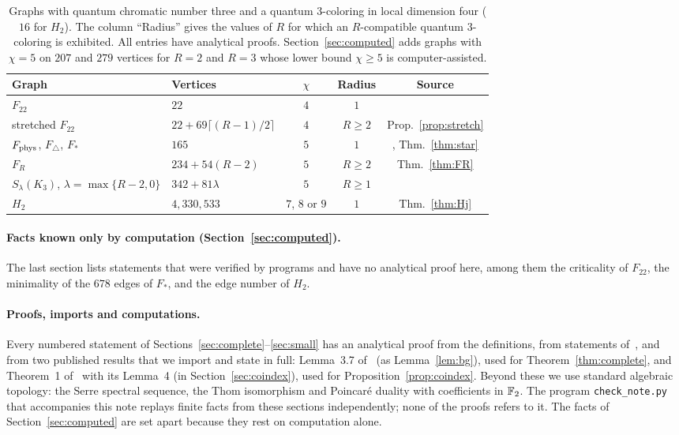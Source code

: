 \begin{table}[t]
\centering
\small\setlength{\tabcolsep}{5pt}
\begin{tabular}{@{}llccc@{}}
\toprule
Graph & Vertices & $\chi$ & Radius & Source\\
\midrule
$F_{22}$ & $22$ & $4$ & $1$ & \cite[Prop.~6.1]{Z}\\
stretched $F_{22}$ & $22+69\lceil(R-1)/2\rceil$ & $4$ & $R\ge2$ & Prop.~\ref{prop:stretch}\\
$F_{\rm phys}$, $F_\triangle$, $F_*$ & $165$ & $5$ & $1$ & \cite[Thm.~6.2]{Z}, Thm.~\ref{thm:star}\\
$F_R$ & $234+54(R-2)$ & $5$ & $R\ge2$ & Thm.~\ref{thm:FR}\\
$S_\lambda(K_3)$, $\lambda=\max\{R-2,0\}$ & $342+81\lambda$ & $5$ & $R\ge1$ & \cite[Thm.~2.4]{Z}\\
$H_2$ & $4{,}330{,}533$ & $7$, $8$ or $9$ & $1$ & Thm.~\ref{thm:Hj}\\
\bottomrule
\end{tabular}
\caption{Graphs with quantum chromatic number three and a quantum $3$-coloring in local dimension four ($16$ for $H_2$). The column ``Radius'' gives the values of $R$ for which an $R$-compatible quantum $3$-coloring is exhibited. All entries have analytical proofs. Section~\ref{sec:computed} adds graphs with $\chi=5$ on $207$ and $279$ vertices for $R=2$ and $R=3$ whose lower bound $\chi\ge5$ is computer-assisted.}
\label{tab:small}
\end{table}

\paragraph{Facts known only by computation (Section~\ref{sec:computed}).}
The last section lists statements that were verified by programs and have no analytical proof here, among them the criticality of $F_{22}$, the minimality of the $678$ edges of $F_*$, and the edge number of $H_2$.

\paragraph{Proofs, imports and computations.}
Every numbered statement of Sections~\ref{sec:complete}--\ref{sec:small} has an analytical proof from the definitions, from statements of~\cite{Z}, and from two published results that we import and state in full: Lemma~3.7 of~\cite{BG} (as Lemma~\ref{lem:bg}), used for Theorem~\ref{thm:complete}, and Theorem~1 of~\cite{STW} with its Lemma~4 (in Section~\ref{sec:coindex}), used for Proposition~\ref{prop:coindex}. Beyond these we use standard algebraic topology: the Serre spectral sequence, the Thom isomorphism and Poincar\'e duality with coefficients in $\mathbb F_2$. The program \texttt{check\_note.py} that accompanies this note replays finite facts from these sections independently; none of the proofs refers to it. The facts of Section~\ref{sec:computed} are set apart because they rest on computation alone.

